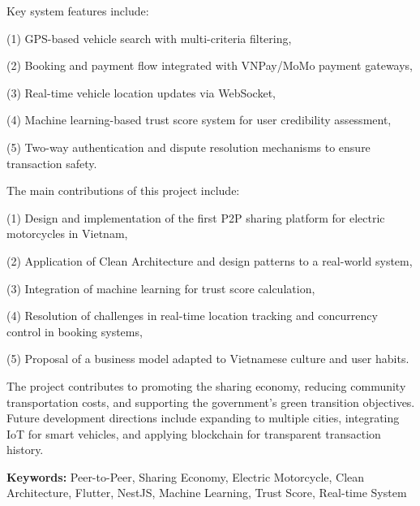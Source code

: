 Key system features include: 

(1) GPS-based vehicle search with multi-criteria filtering, 

(2) Booking and payment flow integrated with VNPay/MoMo payment gateways, 

(3) Real-time vehicle location updates via WebSocket, 

(4) Machine learning-based trust score system for user credibility assessment, 

(5) Two-way authentication and dispute resolution mechanisms to ensure transaction safety.

\newpage
\thispagestyle{empty}
The main contributions of this project include: 

(1) Design and implementation of the first P2P sharing platform for electric motorcycles in Vietnam, 

(2) Application of Clean Architecture and design patterns to a real-world system, 

(3) Integration of machine learning for trust score calculation, 

(4) Resolution of challenges in real-time location tracking and concurrency control in booking systems, 

(5) Proposal of a business model adapted to Vietnamese culture and user habits.

The project contributes to promoting the sharing economy, reducing community transportation costs, and supporting the government's green transition objectives. Future development directions include expanding to multiple cities, integrating IoT for smart vehicles, and applying blockchain for transparent transaction history.

\vspace{0.5cm}

\noindent\textbf{Keywords:} Peer-to-Peer, Sharing Economy, Electric Motorcycle, Clean Architecture, Flutter, NestJS, Machine Learning, Trust Score, Real-time System

